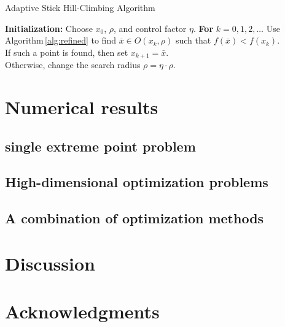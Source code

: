 \documentclass[preprint,12pt]{elsarticle}
\begin{document}
\begin{algorithm}[]
	\caption{Adaptive Stick Hill-Climbing Algorithm} 
	\label{alg:ASHC}
\begin{algorithmic}[]
	\STATE \textbf{Initialization:} Choose $x_0$, $\rho$,
	and control factor $\eta$.
	\STATE \textbf{For} $k=0,1,2,\dots$
	\STATE \hspace{0.5cm} Use Algorithm\,\ref{alg:refined} to find
	$\bar{{x}}\in O(x_k, \rho)$ such that $f(\bar{x})<f(x_k)$.
		 \\
		 \hspace{0.5cm} If such a point is found, then set
		 $x_{k+1}= \bar{x}$.
		  \\
	 	  \hspace{0.5cm} Otherwise, change the search radius
		  $\rho = \eta \cdot \rho$.
\end{algorithmic}
\end{algorithm}



\section{Numerical results}
\label{sec:experiment}

\subsection{single extreme point problem}

\subsection{High-dimensional optimization problems}

\subsection{A combination of optimization methods}

\section{Discussion}

\section*{Acknowledgments}




\end{document}
